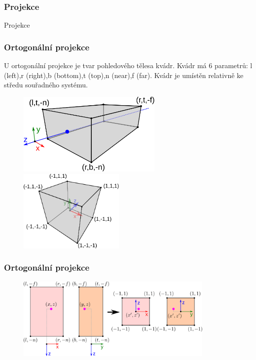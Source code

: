 \begin{frame}
\frametitle{Projekce}
\begin{center}
\Huge {\color{white}Projekce}
\end{center}
\end{frame}

\begin{frame}
\frametitle{Ortogonální projekce}
U ortogonální projekce je tvar pohledového tělesa kvádr.
Kvádr má 6 parametrů: l (left),r (right),b (bottom),t (top),n (near),f (far).
Kvádr je umístěn relativně ke středu souřadného systému.
\begin{figure}[htb]
	\includegraphics[height=4cm,keepaspectratio]{pics/projection/ortho}
	\includegraphics[height=4cm,keepaspectratio]{pics/projection/ndc}
\end{figure}
\end{frame}

\begin{frame}
\frametitle{Ortogonální projekce}
\begin{figure}[htb]
	\includegraphics[height=4cm,keepaspectratio]{pics/projection/fromortho}
\end{figure}
\end{frame}

